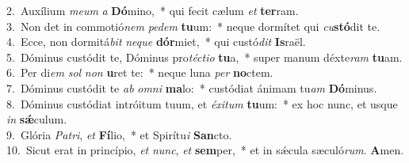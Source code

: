 {2.~}Auxílium \textit{me}\textit{um} \textit{a} \textbf{Dó}mino,~* qui fecit cælum \textit{et} \textbf{ter}ram.\\
{3.~}Non det in commotió\textit{nem} \textit{pe}\textit{dem} \textbf{tu}um:~* neque dormítet qui \textit{cu}\textbf{stó}dit te.\\
{4.~}Ecce, non dormitá\textit{bit} \textit{ne}\textit{que} \textbf{dór}miet,~* qui custó\textit{dit} \textbf{Is}raël.\\
{5.~}Dóminus custódit te, Dóminus pro\textit{té}\textit{cti}\textit{o} \textbf{tu}a,~* super manum déxte\textit{ram} \textbf{tu}am.\\
{6.~}Per di\textit{em} \textit{sol} \textit{non} \textbf{u}ret te:~* neque luna \textit{per} \textbf{no}ctem.\\
{7.~}Dóminus custódit te \textit{ab} \textit{om}\textit{ni} \textbf{ma}lo:~* custódiat ánimam tu\textit{am} \textbf{Dó}minus.\\
{8.~}Dóminus custódiat intróitum tuum, et \textit{é}\textit{xi}\textit{tum} \textbf{tu}um:~* ex hoc nunc, et usque \textit{in} \textbf{sǽ}culum.\\
{9.~}Glória \textit{Pa}\textit{tri}, \textit{et} \textbf{Fí}lio,~* et Spirítu\textit{i} \textbf{San}cto.\\
{10.~}Sicut erat in princípio, \textit{et} \textit{nunc}, \textit{et} \textbf{sem}per,~* et in sǽcula sæculó\textit{rum}. \textbf{A}men.\\
